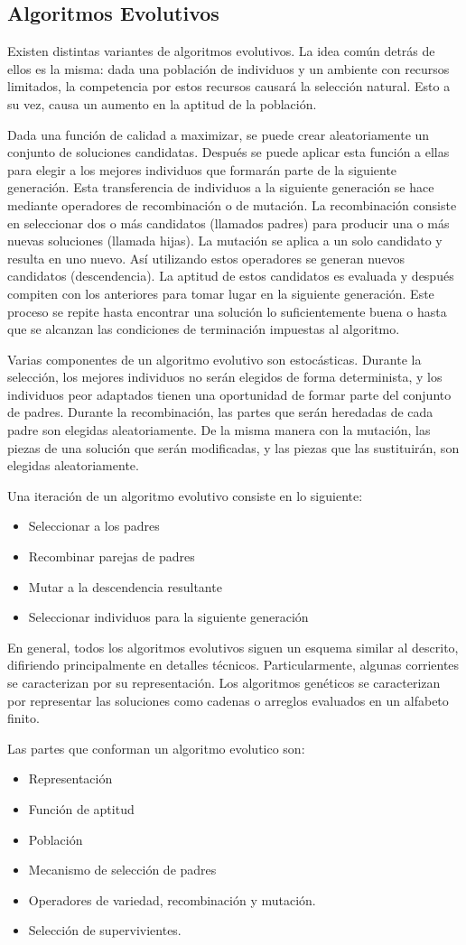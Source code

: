 \subsection*{Algoritmos Evolutivos}
Existen distintas variantes de algoritmos evolutivos. La idea común detrás de ellos es la misma: dada una población de individuos y un ambiente con recursos limitados, la competencia por estos recursos causará la selección natural. Esto a su vez, causa un aumento en la aptitud de la población. 
\par Dada una función de calidad a maximizar, se puede crear aleatoriamente un conjunto de soluciones candidatas. Después se puede aplicar esta función a ellas para elegir a los mejores individuos que formarán parte de la siguiente generación. Esta transferencia de individuos a la siguiente generación se hace mediante operadores de recombinación o de mutación. La recombinación consiste en seleccionar dos o más candidatos (llamados padres) para producir una o más nuevas soluciones (llamada hijas). La mutación se aplica a un solo candidato y resulta en uno nuevo. Así utilizando estos operadores se generan nuevos candidatos (descendencia). La aptitud de estos candidatos es evaluada y después compiten con los anteriores para tomar lugar en la siguiente generación. Este proceso se repite hasta encontrar una solución lo suficientemente buena o hasta que se alcanzan las condiciones de terminación impuestas al algoritmo.
\par Varias componentes de un algoritmo evolutivo son estocásticas. Durante la selección, los mejores individuos no serán elegidos de forma determinista, y los individuos peor adaptados tienen una oportunidad de formar parte del conjunto de padres. Durante la recombinación, las partes que serán heredadas de cada padre son elegidas aleatoriamente. De la misma manera con la mutación, las piezas de una solución que serán modificadas, y las piezas que las sustituirán, son elegidas aleatoriamente.
\par Una iteración de un algoritmo evolutivo consiste en lo siguiente:
\begin{itemize}
	\item Seleccionar a los padres
	\item Recombinar parejas de padres
	\item Mutar a la descendencia resultante
	\item Seleccionar individuos para la siguiente generación
\end{itemize}
En general, todos los algoritmos evolutivos siguen un esquema similar al descrito, difiriendo principalmente en detalles técnicos. Particularmente, algunas corrientes se caracterizan por su representación. Los algoritmos genéticos se caracterizan por representar las soluciones como cadenas o arreglos evaluados en un alfabeto finito.
\par Las partes que conforman un algoritmo evolutico son:
\begin{itemize}
	\item Representación
	\item Función de aptitud
	\item Población
	\item Mecanismo de selección de padres
	\item Operadores de variedad, recombinación y mutación.
	\item Selección de supervivientes.
\end{itemize}

